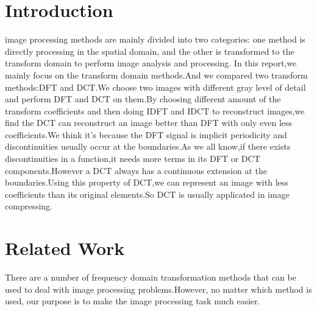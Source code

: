 \documentclass[journal,comsoc]{IEEEtran}
\begin{document}
\section{Introduction}
% 
% 
% 
% 
 image processing methods are mainly divided into
two categories: one method is directly processing in the spatial domain,
and the other is transformed to the transform domain to perform image analysis and processing.
In this report,we mainly focus on the transform domain methods.And we compared two transform
methods:DFT and DCT.We choose two images with different gray level of detail and perform
DFT and DCT on them.By choosing different amount of the transform coefficients and then
doing IDFT and IDCT to reconstruct images,we find the DCT can reconstruct an image better
than DFT with only even less coefficients.We think it's because the DFT signal is implicit
periodicity and discontinuities usually occur at the boundaries.As we all know,if there exists
discontinuities in a function,it needs more terms in its DFT or DCT components.However a DCT
always has a continuous extension at the boundaries.Using this property of DCT,we can represent
an image with less coefficients than its original elements.So DCT is usually applicated in
image compressing.


\section{Related Work}
\label{sec:related work}
There are a number of frequency domain transformation methods that can be used to deal with
image processing problems.However, no matter which method is used, our purpose is to make
the image processing task much easier.
\end{document}
